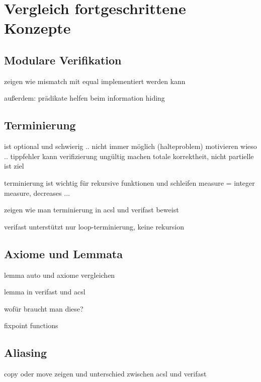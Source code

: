 ﻿
\chapter{Vergleich fortgeschrittene Konzepte}

\section{Modulare Verifikation}

zeigen wie mismatch mit equal implementiert werden kann

außerdem: prädikate helfen beim information hiding

\section{Terminierung}

ist optional und schwierig .. nicht immer möglich (halteproblem)
motivieren wieso .. tippfehler kann verifizierung ungültig machen
totale korrektheit, nicht partielle ist ziel


terminierung ist wichtig für rekursive funktionen und schleifen
measure = integer measure, decreases ...

zeigen wie man terminierung in acsl und verifast beweist

verifast unterstützt nur loop-terminierung, keine rekursion


\section{Axiome und Lemmata}

lemma auto und axiome vergleichen

lemma in verifast und acsl

wofür braucht man diese?

fixpoint functions

\section{Aliasing}

copy oder move zeigen und unterschied zwischen acsl und verifast



